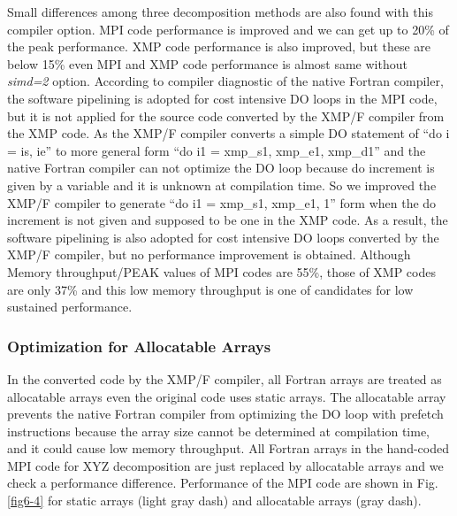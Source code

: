 \documentclass[graybox]{svmult}
\begin{document}
Small differences among three decomposition methods are also found with this compiler option. MPI code performance is improved and we can get up to 20\% of the peak performance. XMP code performance is also improved, but these are below 15\% even MPI and XMP code performance is almost same without {\it simd=2} option. According to compiler diagnostic of the native Fortran compiler, the software pipelining is adopted for cost intensive DO loops in the MPI code, but it is not applied for the source code converted by the XMP/F compiler from the XMP code. As the XMP/F compiler converts a simple DO statement of ``do i = is, ie'' to more general form ``do i1 = xmp\_s1, xmp\_e1, xmp\_d1'' and the native Fortran compiler can not optimize the DO loop because do increment is given by a variable and it is unknown at compilation time. So we improved the XMP/F compiler to generate ``do i1 = xmp\_s1, xmp\_e1, 1'' form when the do increment is not given and supposed to be one in the XMP code. As a result, the software pipelining is also adopted for cost intensive DO loops converted by the XMP/F compiler, but no performance improvement is obtained. Although Memory throughput/PEAK values of MPI codes are 55\%, those of XMP codes are only 37\% and this low memory throughput is one of candidates for low sustained performance. 

\subsubsection{Optimization for Allocatable Arrays}
In the converted code by the XMP/F compiler, all Fortran arrays are treated as allocatable arrays even the original code uses static arrays. The allocatable array prevents the native Fortran compiler from optimizing the DO loop with prefetch instructions because the array size cannot be determined at compilation time, and it could cause low memory throughput. All Fortran arrays in the hand-coded MPI code for XYZ decomposition are just replaced by allocatable arrays and we check a performance difference. Performance of the MPI code are shown in Fig. \ref{fig6-4} for static arrays (light gray dash) and allocatable arrays (gray dash).
\end{document}
